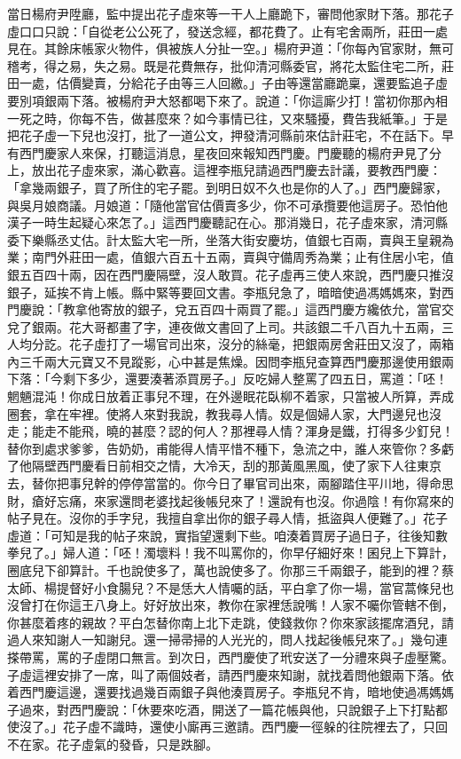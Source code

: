 \begin{showcontents}{}
當日楊府尹陞廳，監中提出花子虛來等一干人上廳跪下，審問他家財下落。那花子虛口口只說：「自從老公公死了，發送念經，都花費了。止有宅舍兩所，莊田一處見在。其餘床帳家火物件，俱被族人分扯一空。」楊府尹道：「你每內官家財，無可稽考，得之易，失之易。既是花費無存，批仰清河縣委官，將花太監住宅二所，莊田一處，估價變賣，分給花子由等三人回繳。」子由等還當廳跪稟，還要監追子虛要別項銀兩下落。被楊府尹大怒都喝下來了。說道：「你這廝少打！當初你那內相一死之時，你每不告，做甚麼來？如今事情已往，又來騷擾，費告我紙筆。」于是把花子虛一下兒也沒打，批了一道公文，押發清河縣前來估計莊宅，不在話下。早有西門慶家人來保，打聽這消息，星夜回來報知西門慶。門慶聽的楊府尹見了分上，放出花子虛來家，滿心歡喜。這裡李瓶兒請過西門慶去計議，要教西門慶：「拿幾兩銀子，買了所住的宅子罷。到明日奴不久也是你的人了。」西門慶歸家，與吳月娘商議。月娘道：「隨他當官估價賣多少，你不可承攬要他這房子。恐怕他漢子一時生起疑心來怎了。」這西門慶聽記在心。那消幾日，花子虛來家，清河縣委下樂縣丞丈估。計太監大宅一所，坐落大街安慶坊，值銀七百兩，賣與王皇親為業；南門外莊田一處，值銀六百五十五兩，賣與守備周秀為業；止有住居小宅，值銀五百四十兩，因在西門慶隔壁，沒人敢買。花子虛再三使人來說，西門慶只推沒銀子，延挨不肯上帳。縣中緊等要回文書。李瓶兒急了，暗暗使過馮媽媽來，對西門慶說：「教拿他寄放的銀子，兌五百四十兩買了罷。」這西門慶方纔依允，當官交兌了銀兩。花大哥都畫了字，連夜做文書回了上司。共該銀二千八百九十五兩，三人均分訖。花子虛打了一場官司出來，沒分的絲毫，把銀兩房舍莊田又沒了，兩箱內三千兩大元寶又不見蹤影，心中甚是焦燥。因問李瓶兒查算西門慶那邊使用銀兩下落：「今剩下多少，還要湊著添買房子。」反吃婦人整罵了四五日，罵道：「呸！魍魎混沌！你成日放着正事兒不理，在外邊眠花臥柳不着家，只當被人所算，弄成圈套，拿在牢裡。使將人來對我說，教我尋人情。奴是個婦人家，大門邊兒也沒走；能走不能飛，曉的甚麼？認的何人？那裡尋人情？渾身是鐵，打得多少釘兒！替你到處求爹爹，告奶奶，甫能得人情平惜不種下，急流之中，誰人來管你？多虧了他隔壁西門慶看日前相交之情，大冷天，刮的那黃風黑風，使了家下人往東京去，替你把事兒幹的停停當當的。你今日了畢官司出來，兩腳踏住平川地，得命思財，瘡好忘痛，來家還問老婆找起後帳兒來了！還說有也沒。你過陰！有你寫來的帖子見在。沒你的手字兒，我擅自拿出你的銀子尋人情，抵盜與人便難了。」花子虛道：「可知是我的帖子來說，實指望還剩下些。咱湊着買房子過日子，往後知數拳兒了。」婦人道：「呸！濁壞料！我不叫罵你的，你早仔細好來！囷兒上下算計，圈底兒下卻算計。千也說使多了，萬也說使多了。你那三千兩銀子，能到的裡？蔡太師、楊提督好小食腸兒？不是恁大人情囑的話，平白拿了你一場，當官蒿條兒也沒曾打在你這王八身上。好好放出來，教你在家裡恁說嘴！人家不囑你管轄不倒，你甚麼着疼的親故？平白怎替你南上北下走跳，使錢救你？你來家該擺席酒兒，請過人來知謝人一知謝兒。還一掃帚掃的人光光的，問人找起後帳兒來了。」幾句連搽帶罵，罵的子虛閉口無言。到次日，西門慶使了玳安送了一分禮來與子虛壓驚。子虛這裡安排了一席，叫了兩個妓者，請西門慶來知謝，就找着問他銀兩下落。依着西門慶這邊，還要找過幾百兩銀子與他湊買房子。李瓶兒不肯，暗地使過馮媽媽子過來，對西門慶說：「休要來吃酒，開送了一篇花帳與他，只說銀子上下打點都使沒了。」花子虛不識時，還使小廝再三邀請。西門慶一徑躲的往院裡去了，只回不在家。花子虛氣的發昏，只是跌腳。
\end{showcontents}
